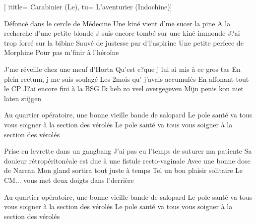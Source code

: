 [
ititle= {Carabinier (Le)},
tu= {L'aventurier (Indochine)}]


\beginverse
Défoncé dans le cercle de Médecine
Une kiné vient d'me sucer la pine
A la recherche d'une petite blonde
J suis encore tombé sur une kiné immonde
J?ai trop forcé sur la bibine
Sauvé de justesse par d'l'aspirine
Une petite perfeee de Morphine
Pour pas m'finir à l'héroïne
\endverse

\beginverse
J'me réveille chez une meuf d'Horta
Qu'est c?que j lui ai mis à ce gros tas
En plein rectum, j me suis soulagé
Les 2mois qu' j'avais accumulés
En affonant tout le CP
J?ai encore fini à la BSG
Ik heb zo veel overgegeven
Mijn penis kon niet laten stijgen
\endverse

\beginchorus
Au quartier opératoire, une bonne vieille bande de salopard
Le pole santé va tous vous soigner à la section des vérolés
Le pole santé va tous vous soigner à la section des vérolés
\endchorus

\beginverse
Prise en levrette dans un gangbang
J'ai pas eu l'temps de suturer ma patiente
Sa douleur rétropéritonéale
est due à une fistule recto-vaginale
Avec une bonne dose de Narcan
Mon gland sortira tout juste à temps
Tel un bon plaisir solitaire
Le CM... vous met deux doigts dans l'derrière
\endverse

\beginchorus
Au quartier opératoire, une bonne vieille bande de salopard
Le pole santé va tous vous soigner à la section des vérolés
Le pole santé va tous vous soigner à la section des vérolés
\endchorus

\endsong